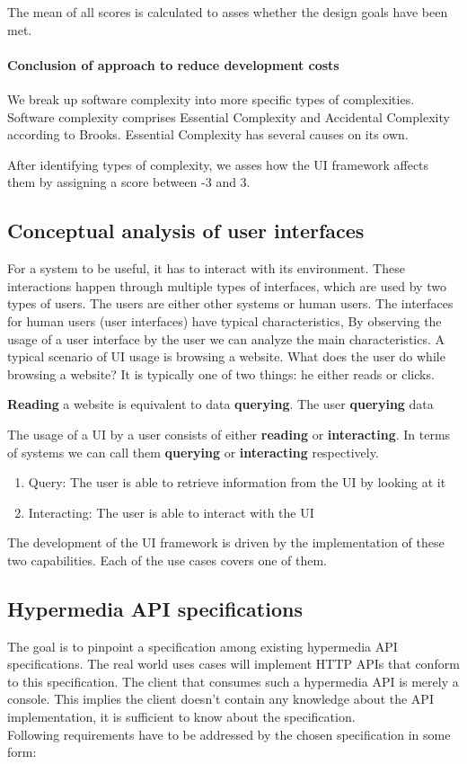 The mean of all scores is calculated to asses whether the design goals have been met.

\paragraph{Conclusion of approach to reduce development costs}
We break up software complexity into more specific types of complexities. Software complexity comprises Essential Complexity and Accidental Complexity according to Brooks. Essential Complexity has several causes on its own.

After identifying types of complexity, we asses how the UI framework affects them by assigning a score between -3 and 3.

\subsection{Conceptual analysis of user interfaces}
For a system to be useful, it has to interact with its environment. These interactions happen through multiple types of interfaces, which are used by two types of users. The users are either other systems or human users.
The interfaces for human users (user interfaces) have typical characteristics,
By observing the usage of a user interface by the user we can analyze the main characteristics. A typical scenario of UI usage is browsing a website. What does the user do while browsing a website? It is typically one of two things: he either reads or clicks.

\textbf{Reading} a website is equivalent to data \textbf{querying}. The user \textbf{querying} data

The usage of a UI by a user consists of either \textbf{reading} or \textbf{interacting}. In terms of systems we can call them \textbf{querying} or \textbf{interacting} respectively.
\begin{enumerate}
  \item Query: The user is able to retrieve information from the UI by looking at it
  \item Interacting: The user is able to interact with the UI
\end{enumerate}

The development of the UI framework is driven by the implementation of these two capabilities. Each of the use cases covers one of them.


\subsection{Hypermedia API specifications}
The goal is to pinpoint a specification among existing hypermedia API specifications. The real world uses cases will implement HTTP APIs that conform to this specification. The client that consumes such a hypermedia API is merely a console. This implies the client doesn't contain any knowledge about the API implementation, it is sufficient to know about the specification. \\ Following requirements have to be addressed by the chosen specification in some form:

